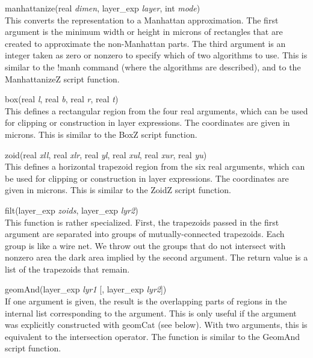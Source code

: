 \begin{description}
\item{\vt manhattanize}(real {\it dimen\/}, layer\_exp {\it layer\/},
 int {\it mode\/})\\
This converts the representation to a Manhattan approximation.  The
first argument is the minimum width or height in microns of rectangles
that are created to approximate the non-Manhattan parts.  The third
argument is an integer taken as zero or nonzero to specify which of
two algorithms to use.  This is similar to the {\cb !manh} command
(where the algorithms are described), and to the {\vt ManhattanizeZ}
script function.

\item{\vt box}(real {\it l\/}, real {\it b\/}, real {\it r\/},
 real {\it t\/})\\
This defines a rectangular region from the four real arguments, which
can be used for clipping or construction in layer expressions.  The
coordinates are given in microns.  This is similar to the {\vt BoxZ}
script function.

\item{\vt zoid}(real {\it xll\/}, real {\it xlr\/}, real {\it yl\/},
real {\it xul\/}, real {\it xur\/}, real {\it yu\/})\\
This defines a horizontal trapezoid region from the six real
arguments, which can be used for clipping or construction in layer
expressions.  The coordinates are given in microns.  This is similar
to the {\vt ZoidZ} script function.

\item{\vt filt}(layer\_exp {\it zoids\/}, layer\_exp {\it lyr2\/})\\
This function is rather specialized.  First, the trapezoids passed in
the first argument are separated into groups of mutually-connected
trapezoids.  Each group is like a wire net.  We throw out the groups
that do not intersect with nonzero area the dark area implied by the
second argument.  The return value is a list of the trapezoids that
remain.

\item{\vt geomAnd}(layer\_exp {\it lyr1} [, layer\_exp {\it lyr2\/}])\\
If one argument is given, the result is the overlapping parts of
regions in the internal list corresponding to the argument.  This is
only useful if the argument was explicitly constructed with {\vt
geomCat} (see below).  With two arguments, this is equivalent to the
intersection operator.  The function is similar to the {\vt GeomAnd}
script function.


\end{description}
